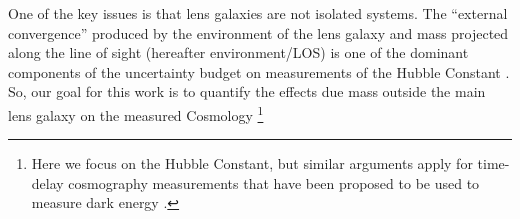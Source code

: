 One of the key issues is that lens galaxies are not isolated systems. The ``external convergence'' produced by the environment of the lens galaxy and mass projected along the line of sight (hereafter environment/LOS) is one of the dominant components of the uncertainty budget on measurements of the Hubble Constant \citep{Suyu12}. So, our goal for this work is to quantify the effects due mass outside the main lens galaxy on the measured Cosmology \footnote{Here we focus on the Hubble Constant, but similar arguments apply for time-delay cosmography measurements that have been proposed to be used to measure dark energy \citep{Treu13}.}